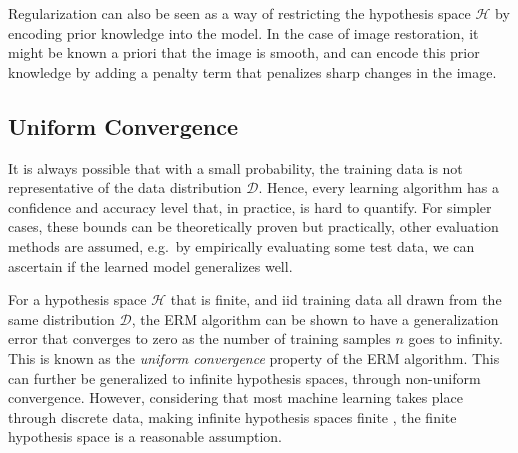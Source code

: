 Regularization can also be seen as a way of restricting the hypothesis space $\mathcal{H}$ by encoding prior knowledge into the model. In the case of image restoration, it might be known a priori that the image is smooth, and can encode this prior knowledge by adding a penalty term that penalizes sharp changes in the image.


\subsection{Uniform Convergence}
It is always possible that with a small probability, the training data is not representative of the data distribution $\mathcal{D}$. Hence, every learning algorithm has a confidence and accuracy level that, in practice, is hard to quantify. For simpler cases, these bounds can be theoretically proven but practically, other evaluation methods are assumed, e.g.\ by empirically evaluating some test data, we can ascertain if the learned model generalizes well.

For a hypothesis space $\mathcal{H}$ that is finite, and \gls{iid} training data all drawn from the same distribution $\mathcal{D}$, the \gls{ERM} algorithm can be shown to have a generalization error that converges to zero as the number of training samples $n$ goes to infinity. This is known as the \textit{uniform convergence}  property of the \gls{ERM} algorithm. This can further be generalized to infinite  hypothesis spaces, through non-uniform  convergence. However, considering that most machine learning takes place through discrete data, making infinite  hypothesis spaces finite , the finite  hypothesis space is a reasonable assumption.
